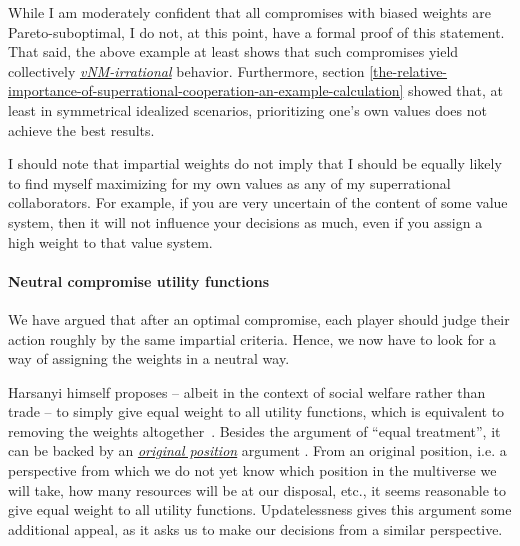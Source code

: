 While I am moderately confident that all compromises with biased weights
are Pareto-suboptimal, I do not, at this point, have a formal proof of
this statement. That said, the above example at least shows that such
compromises yield collectively
\href{https://en.wikipedia.org/wiki/Von_Neumann\%E2\%80\%93Morgenstern_utility_theorem\#The_axioms}{\emph{vNM-irrational}}
behavior. Furthermore, section
\ref{the-relative-importance-of-superrational-cooperation-an-example-calculation} showed that, at least in symmetrical idealized
scenarios, prioritizing one's own values does not achieve the best
results.

I should note that impartial weights do not imply that I should be
equally likely to find myself maximizing for my own values as any of my
superrational collaborators. For example, if you are very uncertain of
the content of some value system, then it will not influence your
decisions as much, even if you assign a high weight to that value
system.

\paragraph{Neutral compromise utility
functions}\label{neutral-compromise-utility-functions}

We have argued that after an optimal compromise, each player should
judge their action roughly by the same impartial criteria. Hence, we now
have to look for a way of assigning the weights in a neutral way.

Harsanyi himself proposes -- albeit in
the context of social welfare rather than trade -- to simply give equal
weight to all utility functions, which is equivalent to removing the
weights altogether~\parencite{Harsanyi1979-ac}. Besides the argument of ``equal treatment'', it can
be backed by an
\href{https://en.wikipedia.org/wiki/Original_position}{\emph{original
position}} argument
\parencite{Harsanyi1953-mj,Harsanyi1955-ou,Freeman2016-kg}.
From an original position, i.e. a perspective from which we do not yet
know which position in the multiverse we will take, how many resources
will be at our disposal, etc., it seems reasonable to give equal weight
to all utility functions. Updatelessness gives this argument some
additional appeal, as it asks us to make our decisions from a similar
perspective.

